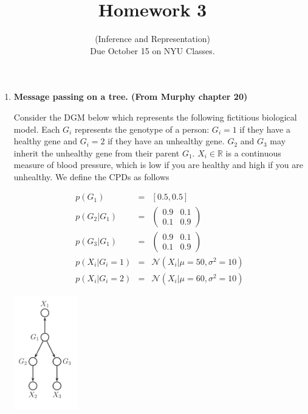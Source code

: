 \documentclass{article}
\date{}
\title{Homework 3}
\author{(Inference and Representation) 
\\ Due October 15 on NYU Classes.  }
\begin{document}
\maketitle

\begin{enumerate}

\item {\bf Message passing on a tree. (From Murphy chapter 20)} 

Consider the DGM below which represents the following fictitious biological model. Each $G_i$ represents the genotype of a person: $G_i = 1$ if they have a healthy gene and $G_i = 2$ if they have an unhealthy gene. $G_2$ and $G_3$ may inherit the unhealthy gene from their parent $G_1$. $X_i\in \mathbb R$ is a continuous measure of blood pressure, which is low if you are healthy and high if you are unhealthy. We define the CPDs as follows

\begin{minipage}{0.6\textwidth}
\vspace{-30pt}
\begin{eqnarray*}
p(G_1) &=& [0.5, 0.5] \\
p(G_2|G_1) &=& \left( \begin{matrix} 0.9 & 0.1 \\ 0.1 & 0.9 \end{matrix} \right) \\
p(G_3|G_1) &=&  \left( \begin{matrix} 0.9 & 0.1 \\ 0.1 & 0.9 \end{matrix} \right) \\
p(X_i | G_i =1) &=& \mathcal N (X_i | \mu=50, \sigma^2 =10) \\
p(X_i | G_i =2) &=& \mathcal N (X_i | \mu=60, \sigma^2 =10) 
\end{eqnarray*}
\end{minipage}
\begin{minipage}{0.7\textwidth}
\includegraphics[width=0.22\textwidth]{fig_hw3}
\end{minipage}


\end{enumerate}
\end{document}
